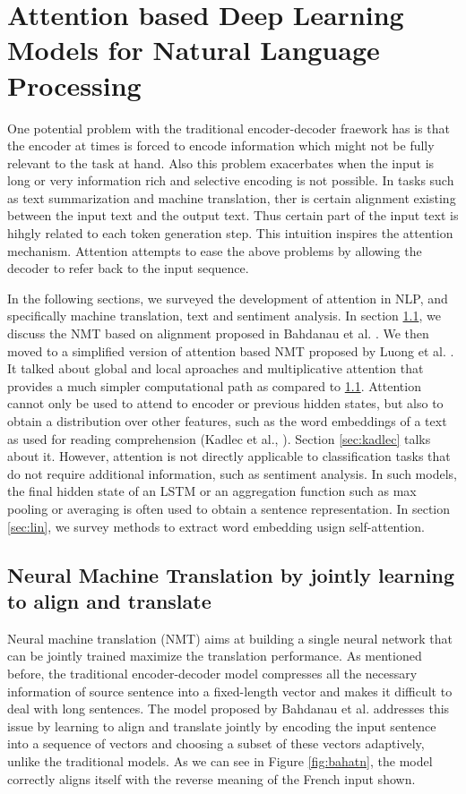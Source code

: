 \documentclass{article}
\begin{document}
\section{Attention based Deep Learning Models for Natural Language Processing}
\label{sec:attention}

	One potential problem with the traditional encoder-decoder fraework has is that the encoder at times is forced to encode information which might not be fully relevant to the task at hand. Also this problem exacerbates when the input is long or very information rich and selective encoding is not possible. In tasks such as text summarization and machine translation, ther is certain alignment existing between the input text and the output text. Thus certain part of the input text is hihgly related to each token generation step. This intuition inspires the attention mechanism. Attention attempts to ease the above problems by allowing the decoder to refer back to the input sequence.
	
	In the following sections, we surveyed the development of attention in NLP, and specifically machine translation, text and sentiment analysis. In section \ref{sec:bahnmt}, we discuss the NMT based on alignment proposed in Bahdanau et al. \cite{bahattn}. We then moved to a simplified version of attention based NMT proposed by Luong et al. \cite{luongatn}. It talked about global and local aproaches and multiplicative attention that provides a much simpler computational path as compared to \ref{sec:bahnmt}. Attention cannot only be used to attend to encoder or previous hidden states, but also to obtain a distribution over other features, such as the word embeddings of a text as used for reading comprehension (Kadlec et al., \cite{kadlec}). Section \ref{sec:kadlec} talks about it. However, attention is not directly applicable to classification tasks that do not require additional information, such as sentiment analysis. In such models, the final hidden state of an LSTM or an aggregation function such as max pooling or averaging is often used to obtain a sentence representation. In section \ref{sec:lin}, we survey methods to extract word embedding usign self-attention. 

\subsection{Neural Machine Translation by jointly learning to align and translate}
\label{sec:bahnmt}

	Neural machine translation (NMT) aims at building a single neural network that can be jointly trained maximize the translation performance. As mentioned before, the traditional encoder-decoder model compresses all the necessary information of source sentence into a fixed-length vector and makes it difficult to deal with long sentences. The model proposed by Bahdanau et al. \cite{bahattn} addresses this issue by learning to align and translate jointly by encoding the input sentence into a sequence of vectors and choosing a subset of these vectors adaptively, unlike the traditional models. As we can see in Figure \ref{fig:bahatn}, the model correctly aligns itself with the reverse meaning of the French input shown. 
	
\end{document}
